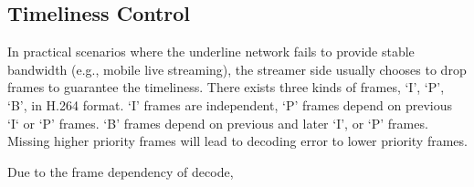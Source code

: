 \subsection{Timeliness Control}
In practical scenarios where the underline network fails to provide stable bandwidth (e.g., mobile live streaming), the streamer side usually chooses to drop frames to guarantee the timeliness.
There exists three kinds of frames, `I', `P', `B', in H.264 format. `I' frames are independent, `P' frames depend on previous `I` or `P' frames. `B' frames depend on previous and later `I', or `P' frames. Missing higher priority frames will lead to decoding error to lower priority frames.

Due to the frame dependency of decode,
\fi 
